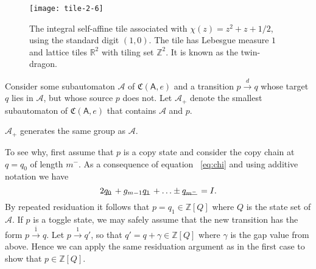 \documentclass[12pt]{svmult}
\def\F#1{\underline{\smash{#1}}\,}       %
\def\cA{\mathcal{A}}
\def\pre#1{{#1}^{-}}
\def\R{\mathbb{R}}
\def\Z{\mathbb{Z}}
\def\AA{\mathsf{A}}             %
\def\ZM#1{\Z[{#1}]}               %
\def\cmpaut{\fC}                %
\def\fC{\mathfrak{C}}           %
\def\trans#1#2#3{{#1}\stackrel{{#2}}{\longrightarrow}{#3}}
\def\trtm{\overline{1}}
\def\unvt{\mathbf{e}_{2}}
\begin{document}

\begin{figure}[t]
  \centering
  \texttt{[image: tile-2-6]}
  \caption{The integral self-affine tile associated with $\chi(z) = z^{2} + z + 1/2$, 
  using the standard digit $(1,0)$. The tile has Lebesgue measure $1$ and lattice tiles 
  $\R^2$ with tiling set $\Z^{2}$. It is known as the twin-dragon.}
  \label{fig:tile-2-6}
\end{figure}


Consider some subautomaton $\cA$ of $\cmpaut(\AA,e)$ and a transition
$\trans{p}{d}{q}$ whose target $q$ lies in $\cA$, but whose source $p$ does not. 
Let $\cA_{+}$ denote the smallest subautomaton  of $\cmpaut(\AA,e)$ that contains $\cA$ and $p$. 

\begin{lemma}
\label{lem:extension}
$\cA_{+}$ generates the same group as $\cA$.
\end{lemma}

To see why, first assume that $p$ is a copy state and consider the copy chain at 
$q = q_{0}$ of length $\pre{m}$. 
As a consequence of equation ~\eqref{eq:chi} and using additive notation we have 
%
\begin{equation}
\label{eq:chi-chain}
2 \F{q_{0}}  + g_{m-1} \F{q_{1}} + \ldots \pm \F{q_{\pre{m}}} = I.
\end{equation}
%
By repeated residuation it follows that $p = q_{1} \in  \ZM{Q}$ where $Q$ is the 
state set of $\cA$. 
%
If $p$ is a toggle state, we may safely assume that the new transition has the form 
$\trans{p}{\trtm}{q}$.  Let $\trans{p}{1}{q'}$, so that $q' = q + \gamma \in \ZM{Q}$
where $\gamma$ is the gap value from above. 
Hence we can apply the same residuation argument as in the first case to show that 
$p \in  \ZM{Q}$.
\end{document}
